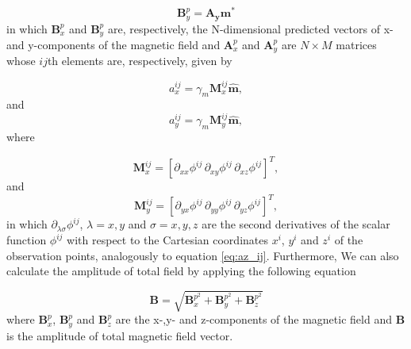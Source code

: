 \begin{equation}
\mathbf{B}_{y}^{p}  = \mathbf{A_y} \mathbf{m}^\ast
\label{eq:pred_vec_y}
\end{equation}
in which  $\mathbf{B}_{x}^{p}$ and $\mathbf{B}_{y}^{p}$ are, respectively, the N-dimensional predicted vectors of x- and y-components of the magnetic field and  $\mathbf{A}_{x}^{p}$ and $\mathbf{A}_{y}^{p}$ are $N \times M$ matrices whose $ij$th elements are, respectively, given by

\begin{equation}
a_{x}^{ij}  = \gamma_m \mathbf{M}_x^{ij} \hat{\mathbf{m}},
\label{eq:ax_ij}
\end{equation}
and 
\begin{equation}
a_{y}^{ij}  = \gamma_m \mathbf{M}_y^{ij} \hat{\mathbf{m}},
\label{eq:ay_ij}
\end{equation}
where

\begin{equation}
\mathbf{M}_x^{ij}  =  [\partial_{xx} \phi^{ij} \, \partial_{xy} \phi^{ij} \, \partial_{xz} \phi^{ij}]^T,
\label{eq:Mx_ij}
\end{equation}
and
\begin{equation}
\mathbf{M}_y^{ij}  =  [\partial_{yx} \phi^{ij} \, \partial_{yy} \phi^{ij} \, \partial_{yz} \phi^{ij}]^T,
\label{eq:My_ij}
\end{equation}
in which $\partial_{\lambda \sigma} \phi^{ij}$, $\lambda = x,y$ and $\sigma = x,y,z$ are the second derivatives of the scalar function $\phi^{ij}$ with respect to the Cartesian coordinates $x^i$, $y^i$ and $z^i$ of the observation points, analogously to equation \ref*{eq:az_ij}. Furthermore, We can also calculate the amplitude of total field by applying the following equation 

\begin{equation}
\mathbf{B} = \sqrt{ \mathbf{B}_{x}^{p^2} + \mathbf{B}_{y}^{p^2} + \mathbf{B}_{z}^{p^2} }  
\label{eq:total_field}
\end{equation}
where  $\mathbf{B}_{x}^{p}$, $\mathbf{B}_{y}^{p} $ and  $\mathbf{B}_{z}^{p}$ are the x-,y- and z-components of the magnetic field and $\mathbf{B}$ is the amplitude of total magnetic field vector. 



  


 

